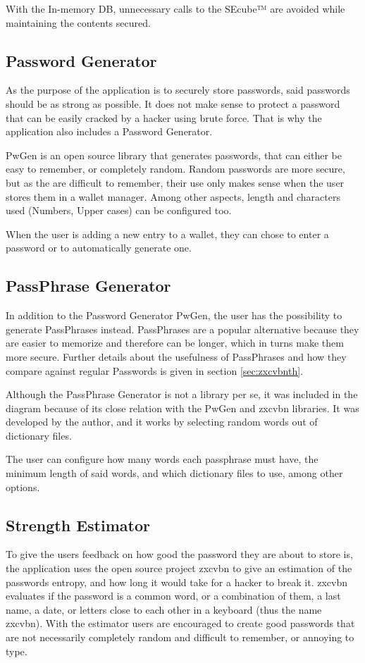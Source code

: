With the In-memory DB, unnecessary calls to the SEcube™ are avoided while maintaining the contents secured.

\subsection{Password Generator}
As the purpose of the application is to securely store passwords, said passwords should be as strong as possible. It does not make sense to protect a password that can be easily cracked by a hacker using brute force. That is why the application also includes a Password Generator.

PwGen \cite{pwgen} is an open source library that generates passwords, that can either be easy to remember, or completely random. Random passwords are more secure, but as the are difficult to remember, their use only makes sense when the user stores them in a wallet manager. Among other aspects, length and characters used (Numbers, Upper cases) can be configured too.

When the user is adding a new entry to a wallet, they can chose to enter a password or to automatically generate one.

\subsection{PassPhrase Generator}
In addition to the Password Generator PwGen, the user has the possibility to generate PassPhrases instead. PassPhrases are a popular alternative because they are easier to memorize and therefore can be longer, which in turns make them more secure. Further details about the usefulness of PassPhrases and how they compare against regular Passwords is given in section \ref{sec:zxcvbnth}.

Although the PassPhrase Generator is not a library per se, it was included in the diagram because of its close relation with the PwGen and zxcvbn \cite{zxgit} libraries. It was developed by the author, and it works by selecting random words out of dictionary files. 

The user can configure how many words each passphrase must have, the minimum length of said words, and which dictionary files to use, among other options.

\subsection{Strength Estimator}
To give the users feedback on how good the password they are about to store is, the application uses the open source project zxcvbn to give an estimation of the passwords entropy, and how long it would take for a hacker to break it. zxcvbn evaluates if the password is a common word, or a combination of them, a last name, a date, or letters close to each other in a keyboard (thus the name zxcvbn). With the estimator users are encouraged to create good passwords that are not necessarily completely random and difficult to remember, or annoying to type.

